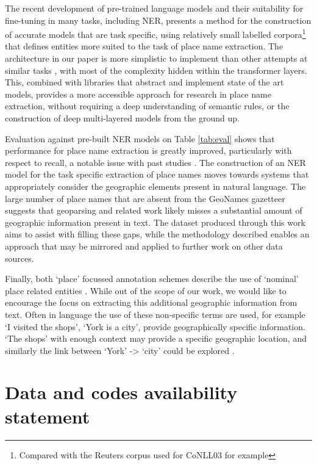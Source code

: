 \documentclass[]{interact}
\theoremstyle{plain}%
\theoremstyle{definition}
\theoremstyle{remark}
\begin{document}
The recent development of pre-trained language models and their
suitability for fine-tuning in many tasks, including NER, presents a
method for the construction of accurate models that are task specific,
using relatively small labelled corpora\footnote{Compared with the
  Reuters corpus used for CoNLL03 for example} that defines entities
more suited to the task of place name extraction. The architecture in
our paper is more simplistic to implement than other attempts at similar
tasks \citep[e.g.][]{weissenbacher2019}, with most of the complexity
hidden within the transformer layers. This, combined with libraries that
abstract and implement state of the art models, provides a more
accessible approach for research in place name extraction, without
requiring a deep understanding of semantic rules, or the construction of
deep multi-layered models from the ground up.

Evaluation against pre-built NER models on Table \ref{tab:eval} shows
that performance for place name extraction is greatly improved,
particularly with respect to recall, a notable issue with past studies
\citep{hu2019, karimzadeh2019}. The construction of an NER model for the
task specific extraction of place names moves towards systems that
appropriately consider the geographic elements present in natural
language. The large number of place names that are absent from the
GeoNames gazetteer suggests that geoparsing and related work likely
misses a substantial amount of geographic information present in text.
The dataset produced through this work aims to assist with filling these
gaps, while the methodology described enables an approach that may be
mirrored and applied to further work on other data sources.

Finally, both `place' focussed annotation schemes describe the use of
`nominal' place related entities \citep{mani2010, pustejovsky2017}.
While out of the scope of our work, we would like to encourage the focus
on extracting this additional geographic information from text. Often in
language the use of these non-specific terms are used, for example `I
visited the shops', `York is a city', provide geographically specific
information. `The shops' with enough context may provide a specific
geographic location, and similarly the link between `York'
-\textgreater{} `city' could be explored \citep{couclelis2010}.

\hypertarget{data-and-codes-availability-statement}{%
\section*{Data and codes availability
statement}\label{data-and-codes-availability-statement}}
\end{document}
